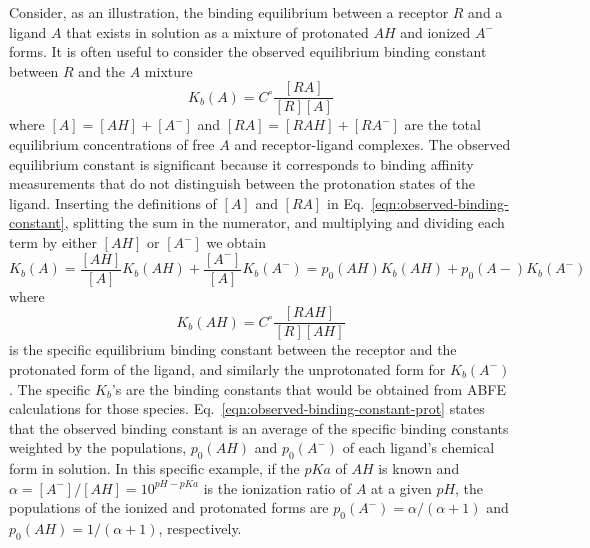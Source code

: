 \documentclass[9pt,bestpractices]{livecoms}
\begin{document}
Consider, as an illustration, the binding equilibrium between a receptor $R$ and a ligand $A$ that exists in solution as a mixture of protonated $AH$ and ionized $A^-$ forms. It is often useful to consider the observed equilibrium binding constant between $R$ and the $A$ mixture 
\begin{equation}
  K_b(A) = C^\circ \frac{[RA]}{[R][A]}
  \label{eqn:observed-binding-constant}
\end{equation}
where $[A] = [AH] + [A^-]$ and $[RA] = [RAH] + [RA^-]$ are the total equilibrium concentrations of free $A$ and receptor-ligand complexes. The observed equilibrium constant is significant because it corresponds to binding affinity measurements that do not distinguish between the protonation states of the ligand. Inserting the definitions of $[A]$ and $[RA]$ in Eq.~\ref{eqn:observed-binding-constant}, splitting the sum in the numerator, and multiplying and dividing each term by either $[AH]$ or $[A^-]$ we obtain
\begin{equation}
  K_b(A) = \frac{[AH]}{[A]}  K_b(AH) +  \frac{[A^-]}{[A]} K_b(A^-) =  p_0(AH) K_b(AH) +  p_0(A-) K_b(A^-)
  \label{eqn:observed-binding-constant-split}
\end{equation}
where
\begin{equation}
  K_b(AH) = C^\circ \frac{[RAH]}{[R][AH]}
  \label{eqn:observed-binding-constant-prot}
\end{equation}
is the specific equilibrium binding constant between the receptor and the protonated form of the ligand, and similarly the unprotonated form for $K_b(A^-)$. The specific $K_b$'s are the binding constants that would be obtained from ABFE calculations for those species. Eq.~\ref{eqn:observed-binding-constant-prot} states that the observed binding constant is an average of the specific binding constants weighted by the populations, $p_0(AH)$ and  $p_0(A^-)$ of each ligand's chemical form in solution. In this specific example, if the $pKa$ of $AH$ is known and $\alpha = [A^-]/[AH] = 10^{pH-pKa} $ is the ionization ratio of $A$ at a given $pH$, the populations of the ionized and protonated forms are $p_0(A^-) = \alpha/(\alpha+1)$ and $p_0(AH) = 1/(\alpha+1)$, respectively.~\cite{champion2024multistate,azimi2022application}
\end{document}
